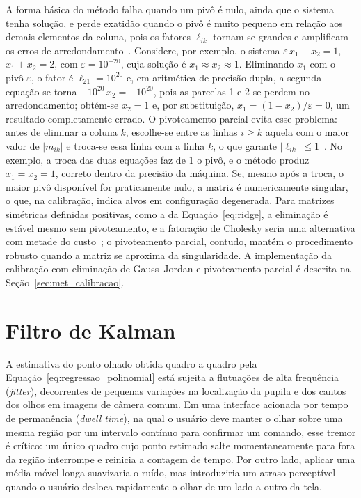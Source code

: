 A forma básica do método falha quando um pivô é nulo, ainda que o sistema tenha solução, e perde exatidão quando o pivô é muito pequeno em relação aos demais elementos da coluna, pois os fatores $\ell_{ik}$ tornam-se grandes e amplificam os erros de arredondamento~\cite{burden2011numerical,golub2013matrix}. Considere, por exemplo, o sistema $\varepsilon\,x_1 + x_2 = 1$, $x_1 + x_2 = 2$, com $\varepsilon = 10^{-20}$, cuja solução é $x_1 \approx x_2 \approx 1$. Eliminando $x_1$ com o pivô $\varepsilon$, o fator é $\ell_{21} = 10^{20}$ e, em aritmética de precisão dupla, a segunda equação se torna $-10^{20}\,x_2 = -10^{20}$, pois as parcelas 1 e 2 se perdem no arredondamento; obtém-se $x_2 = 1$ e, por substituição, $x_1 = (1 - x_2)/\varepsilon = 0$, um resultado completamente errado. O pivoteamento parcial evita esse problema: antes de eliminar a coluna $k$, escolhe-se entre as linhas $i \ge k$ aquela com o maior valor de $|m_{ik}|$ e troca-se essa linha com a linha $k$, o que garante $|\ell_{ik}| \le 1$~\cite{golub2013matrix}. No exemplo, a troca das duas equações faz de 1 o pivô, e o método produz $x_1 = x_2 = 1$, correto dentro da precisão da máquina. Se, mesmo após a troca, o maior pivô disponível for praticamente nulo, a matriz é numericamente singular, o que, na calibração, indica alvos em configuração degenerada. Para matrizes simétricas definidas positivas, como a da Equação~\ref{eq:ridge}, a eliminação é estável mesmo sem pivoteamento, e a fatoração de Cholesky seria uma alternativa com metade do custo~\cite{golub2013matrix}; o pivoteamento parcial, contudo, mantém o procedimento robusto quando a matriz se aproxima da singularidade. A implementação da calibração com eliminação de Gauss--Jordan e pivoteamento parcial é descrita na Seção~\ref{sec:met_calibracao}.

\section{Filtro de Kalman} \label{sec:kalman}

A estimativa do ponto olhado obtida quadro a quadro pela Equação~\ref{eq:regressao_polinomial} está sujeita a flutuações de alta frequência (\textit{jitter}), decorrentes de pequenas variações na localização da pupila e dos cantos dos olhos em imagens de câmera comum. Em uma interface acionada por tempo de permanência (\textit{dwell time}), na qual o usuário deve manter o olhar sobre uma mesma região por um intervalo contínuo para confirmar um comando, esse tremor é crítico: um único quadro cujo ponto estimado salte momentaneamente para fora da região interrompe e reinicia a contagem de tempo. Por outro lado, aplicar uma média móvel longa suavizaria o ruído, mas introduziria um atraso perceptível quando o usuário desloca rapidamente o olhar de um lado a outro da tela.

